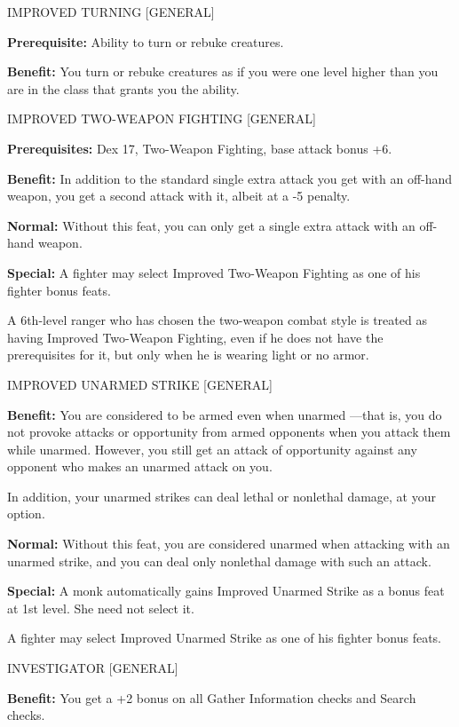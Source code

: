 \documentclass{article}
\begin{document}
\vspace{12pt}
IMPROVED TURNING [GENERAL]

\textbf{Prerequisite:} Ability to turn or rebuke creatures.

\textbf{Benefit:} You turn or rebuke creatures as if you were one level higher 
than you are in the class that grants you the ability.

\vspace{12pt}
IMPROVED TWO-WEAPON FIGHTING [GENERAL]

\textbf{Prerequisites:} Dex 17, Two-Weapon Fighting, base attack bonus +6.

\textbf{Benefit:} In addition to the standard single extra attack you get with 
an off-hand weapon, you get a second attack with it, albeit at a -5 penalty.

\textbf{Normal:} Without this feat, you can only get a single extra attack with 
an off-hand weapon.

\textbf{Special:} A fighter may select Improved Two-Weapon Fighting as one of his 
fighter bonus feats.

A 6th-level ranger who has chosen the two-weapon combat style is treated as having 
Improved Two-Weapon Fighting, even if he does not have the prerequisites for it, 
but only when he is wearing light or no armor.

\vspace{12pt}
IMPROVED UNARMED STRIKE [GENERAL]

\textbf{Benefit:} You are considered to be armed even when unarmed ---that is, 
you do not provoke attacks or opportunity from armed opponents when you attack 
them while unarmed. However, you still get an attack of opportunity against any 
opponent who makes an unarmed attack on you.

In addition, your unarmed strikes can deal lethal or nonlethal damage, at your 
option.

\textbf{Normal: }Without this feat, you are considered unarmed when attacking with 
an unarmed strike, and you can deal only nonlethal damage with such an attack.

\textbf{Special:} A monk automatically gains Improved Unarmed Strike as a bonus 
feat at 1st level. She need not select it. 

A fighter may select Improved Unarmed Strike as one of his fighter bonus feats.

\vspace{12pt}
INVESTIGATOR [GENERAL]

\textbf{Benefit:} You get a +2 bonus on all Gather Information checks and Search 
checks.
\end{document}

